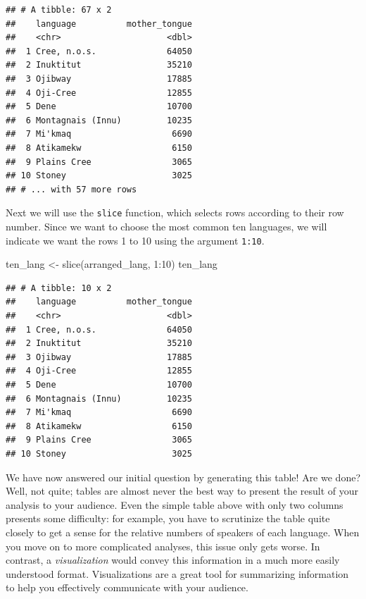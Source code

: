 \documentclass[
  12pt,
]{krantz}
\newenvironment{Shaded}{\begin{snugshade}}{\end{snugshade}}
\newcommand{\DecValTok}[1]{\textcolor[rgb]{0.06,0.06,0.06}{#1}}
\newcommand{\FunctionTok}[1]{\textcolor[rgb]{0,0,0}{#1}}
\newcommand{\NormalTok}[1]{#1}
\newcommand{\OtherTok}[1]{\textcolor[rgb]{0.37,0.37,0.37}{#1}}
\newcommand{\SpecialCharTok}[1]{\textcolor[rgb]{0,0,0}{#1}}
\begin{document}
\begin{verbatim}
## # A tibble: 67 x 2
##    language          mother_tongue
##    <chr>                     <dbl>
##  1 Cree, n.o.s.              64050
##  2 Inuktitut                 35210
##  3 Ojibway                   17885
##  4 Oji-Cree                  12855
##  5 Dene                      10700
##  6 Montagnais (Innu)         10235
##  7 Mi'kmaq                    6690
##  8 Atikamekw                  6150
##  9 Plains Cree                3065
## 10 Stoney                     3025
## # ... with 57 more rows
\end{verbatim}

Next we will use the \texttt{slice} function, which selects rows according to their
row number. Since we want to choose the most common ten languages, we will indicate we want the
rows 1 to 10 using the argument \texttt{1:10}.

\begin{Shaded}
\begin{Highlighting}[]
\NormalTok{ten\_lang }\OtherTok{\textless{}{-}} \FunctionTok{slice}\NormalTok{(arranged\_lang, }\DecValTok{1}\SpecialCharTok{:}\DecValTok{10}\NormalTok{)}
\NormalTok{ten\_lang}
\end{Highlighting}
\end{Shaded}

\begin{verbatim}
## # A tibble: 10 x 2
##    language          mother_tongue
##    <chr>                     <dbl>
##  1 Cree, n.o.s.              64050
##  2 Inuktitut                 35210
##  3 Ojibway                   17885
##  4 Oji-Cree                  12855
##  5 Dene                      10700
##  6 Montagnais (Innu)         10235
##  7 Mi'kmaq                    6690
##  8 Atikamekw                  6150
##  9 Plains Cree                3065
## 10 Stoney                     3025
\end{verbatim}

We have now answered our initial question by generating this table!
Are we done? Well, not quite; tables are almost never the best way to present
the result of your analysis to your audience. Even the simple table above with
only two columns presents some difficulty: for example, you have to scrutinize
the table quite closely to get a sense for the relative numbers of speakers of
each language. When you move on to more complicated analyses, this issue only
gets worse. In contrast, a \emph{visualization} would convey this information in a much
more easily understood format.
Visualizations are a great tool for summarizing information to help you
effectively communicate with your audience.
\end{document}
